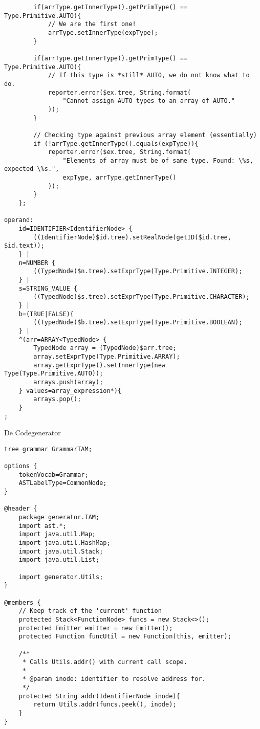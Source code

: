 \begin{landscape}
\begin{lstlisting}
        if(arrType.getInnerType().getPrimType() == Type.Primitive.AUTO){
            // We are the first one!
            arrType.setInnerType(expType);
        }

        if(arrType.getInnerType().getPrimType() == Type.Primitive.AUTO){
            // If this type is *still* AUTO, we do not know what to do.
            reporter.error($ex.tree, String.format(
                "Cannot assign AUTO types to an array of AUTO."
            ));
        }

        // Checking type against previous array element (essentially)
        if (!arrType.getInnerType().equals(expType)){
            reporter.error($ex.tree, String.format(
                "Elements of array must be of same type. Found: \%s, expected \%s.",
                expType, arrType.getInnerType()
            ));
        }
    };

operand:
    id=IDENTIFIER<IdentifierNode> {
        ((IdentifierNode)$id.tree).setRealNode(getID($id.tree, $id.text));
    } |
    n=NUMBER {
        ((TypedNode)$n.tree).setExprType(Type.Primitive.INTEGER);
    } |
    s=STRING_VALUE {
        ((TypedNode)$s.tree).setExprType(Type.Primitive.CHARACTER);
    } |
    b=(TRUE|FALSE){
        ((TypedNode)$b.tree).setExprType(Type.Primitive.BOOLEAN);
    } |
    ^(arr=ARRAY<TypedNode> {
        TypedNode array = (TypedNode)$arr.tree;
        array.setExprType(Type.Primitive.ARRAY);
        array.getExprType().setInnerType(new Type(Type.Primitive.AUTO));
        arrays.push(array);
    } values=array_expression*){
        arrays.pop();
    } 
;
\end{lstlisting}

De Codegenerator
\begin{lstlisting}
tree grammar GrammarTAM;

options {
    tokenVocab=Grammar;
    ASTLabelType=CommonNode;
}

@header {
    package generator.TAM;
    import ast.*;
    import java.util.Map;
    import java.util.HashMap;
    import java.util.Stack;
    import java.util.List;

    import generator.Utils;
}

@members {
    // Keep track of the 'current' function
    protected Stack<FunctionNode> funcs = new Stack<>();
    protected Emitter emitter = new Emitter();
    protected Function funcUtil = new Function(this, emitter);

    /**
     * Calls Utils.addr() with current call scope.
     *
     * @param inode: identifier to resolve address for.
     */
    protected String addr(IdentifierNode inode){
        return Utils.addr(funcs.peek(), inode);
    }
}


\end{lstlisting}
\end{landscape}
